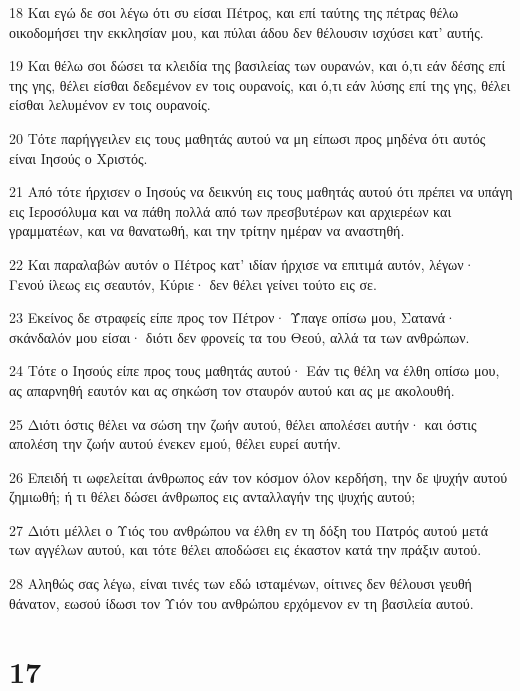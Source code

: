 \par 18 Και εγώ δε σοι λέγω ότι συ είσαι Πέτρος, και επί ταύτης της πέτρας θέλω οικοδομήσει την εκκλησίαν μου, και πύλαι άδου δεν θέλουσιν ισχύσει κατ' αυτής.
\par 19 Και θέλω σοι δώσει τα κλειδία της βασιλείας των ουρανών, και ό,τι εάν δέσης επί της γης, θέλει είσθαι δεδεμένον εν τοις ουρανοίς, και ό,τι εάν λύσης επί της γης, θέλει είσθαι λελυμένον εν τοις ουρανοίς.
\par 20 Τότε παρήγγειλεν εις τους μαθητάς αυτού να μη είπωσι προς μηδένα ότι αυτός είναι Ιησούς ο Χριστός.
\par 21 Από τότε ήρχισεν ο Ιησούς να δεικνύη εις τους μαθητάς αυτού ότι πρέπει να υπάγη εις Ιεροσόλυμα και να πάθη πολλά από των πρεσβυτέρων και αρχιερέων και γραμματέων, και να θανατωθή, και την τρίτην ημέραν να αναστηθή.
\par 22 Και παραλαβών αυτόν ο Πέτρος κατ' ιδίαν ήρχισε να επιτιμά αυτόν, λέγων· Γενού ίλεως εις σεαυτόν, Κύριε· δεν θέλει γείνει τούτο εις σε.
\par 23 Εκείνος δε στραφείς είπε προς τον Πέτρον· Ύπαγε οπίσω μου, Σατανά· σκάνδαλόν μου είσαι· διότι δεν φρονείς τα του Θεού, αλλά τα των ανθρώπων.
\par 24 Τότε ο Ιησούς είπε προς τους μαθητάς αυτού· Εάν τις θέλη να έλθη οπίσω μου, ας απαρνηθή εαυτόν και ας σηκώση τον σταυρόν αυτού και ας με ακολουθή.
\par 25 Διότι όστις θέλει να σώση την ζωήν αυτού, θέλει απολέσει αυτήν· και όστις απολέση την ζωήν αυτού ένεκεν εμού, θέλει ευρεί αυτήν.
\par 26 Επειδή τι ωφελείται άνθρωπος εάν τον κόσμον όλον κερδήση, την δε ψυχήν αυτού ζημιωθή; ή τι θέλει δώσει άνθρωπος εις ανταλλαγήν της ψυχής αυτού;
\par 27 Διότι μέλλει ο Υιός του ανθρώπου να έλθη εν τη δόξη του Πατρός αυτού μετά των αγγέλων αυτού, και τότε θέλει αποδώσει εις έκαστον κατά την πράξιν αυτού.
\par 28 Αληθώς σας λέγω, είναι τινές των εδώ ισταμένων, οίτινες δεν θέλουσι γευθή θάνατον, εωσού ίδωσι τον Υιόν του ανθρώπου ερχόμενον εν τη βασιλεία αυτού.

\chapter{17}

